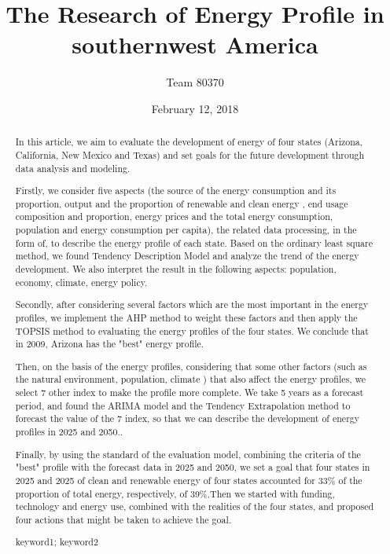 \documentclass[a4paper, 11pt]{article}
\title{The Research of Energy Profile in southernwest America}
\author{Team 80370}
\date{February 12, 2018}
\begin{document}
\begin{abstract}
In this article, we aim to evaluate the development of energy of four states (Arizona, California, New Mexico and Texas) and set goals for the future development through data analysis and modeling.


Firstly, we consider five aspects (the source of the energy consumption and its proportion, output and the proportion of renewable and clean energy , end usage composition and proportion, energy prices and the total energy consumption, population and energy consumption per capita), the related data processing, in the form of, to describe the energy profile of each state. Based on the ordinary least square method, we found Tendency Description Model and analyze the trend of the energy development. We also interpret the result in the following aspects: population, economy, climate, energy policy.


Secondly, after considering several factors which are the most important in the energy profiles, we implement the AHP method to weight these factors and then apply the TOPSIS method to evaluating the energy profiles of the four states. We conclude that in 2009, Arizona has the "best" energy profile.


Then, on the basis of the energy profiles, considering that some other factors (such as the natural environment, population, climate ) that also affect the energy profiles, we select 7 other index to make the profile more complete. We take 5 years as a forecast period, and found the ARIMA model and the Tendency Extrapolation method to forecast the value of the 7 index, so that we can describe the development of energy profiles in 2025 and 2050..


Finally, by using the standard of the evaluation model, combining the criteria of the "best" profile with the forecast data in 2025 and 2050, we set a goal that four states in 2025 and 2025 of clean and renewable energy of four states accounted for 33\% of the proportion of total energy, respectively, of 39\%.Then we started with funding, technology and energy use, combined with the realities of the four states, and proposed four actions that might be taken to achieve the goal.

\begin{keywords}
keyword1; keyword2
\end{keywords}
\end{abstract}
\maketitle
\pagestyle{empty}
\newpage
\tableofcontents
\newpage
\pagestyle{fancy}


\end{document}
